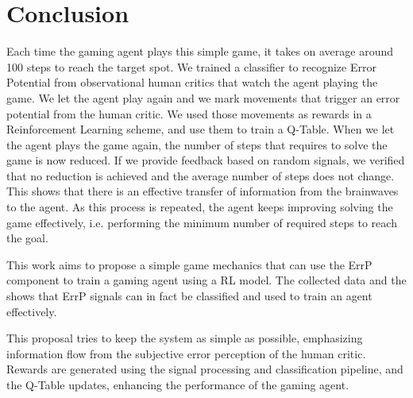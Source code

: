 \documentclass[journal]{IEEEtran}
\begin{document}
{{\section{Conclusion}
\label{conclusions}

Each time the gaming agent plays this simple game, it takes on average around 100 steps to reach the target spot.  We trained a classifier to recognize Error Potential from observational human critics that watch the agent playing the game.  We let the agent play again and we mark movements that trigger an error potential from the human critic.  We used those movements as rewards in a Reinforcement Learning scheme, and use them to train a Q-Table.  When we let the agent plays the game again, the number of steps that requires to solve the game is now reduced.  If we provide feedback based on random signals, we verified that no reduction is achieved and the average number of steps does not change.   This shows that there is an effective transfer of information from the brainwaves to the agent.   As this process is repeated, the agent keeps improving solving the game effectively, i.e. performing the minimum number of required steps to reach the goal.




This work aims to propose a simple game mechanics that can use the ErrP component to train a gaming agent using a RL model. The collected data and the shows that ErrP signals can in fact be classified and used to train an agent effectively.

This proposal tries to keep the system as simple as possible, emphasizing information flow from the subjective error perception of the human critic. Rewards are generated using the signal processing and classification pipeline, and the Q-Table updates, enhancing the performance of the gaming agent.

}}
\end{document}
